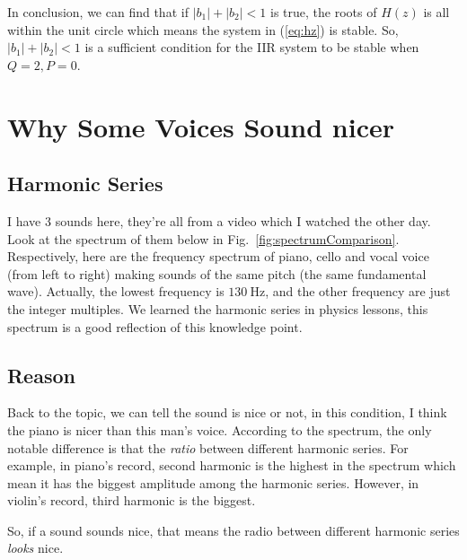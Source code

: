\documentclass{article}
\begin{document}
In conclusion, we can find that if $|b_1| + |b_2| < 1$ is true, the roots of $H(z)$ is all within the unit circle which means the system in (\ref{eq:hz}) is stable. So, $|b_1| + |b_2| < 1$ is a sufficient condition for the IIR system to be stable when $Q = 2, P = 0$.

\section{Why Some Voices Sound nicer}
\subsection{Harmonic Series}
I have 3 sounds here, they're all from a video\cite{harmonicSeries} which I watched the other day. Look at the spectrum of them below in Fig.~\ref{fig:spectrumComparison}. Respectively, here are the frequency spectrum of piano, cello and vocal voice (from left to right) making sounds of the same pitch (the same fundamental wave). Actually, the lowest frequency is $130~ \mathrm{Hz}$, and the other frequency are just the integer multiples. We learned the harmonic series in physics lessons, this spectrum is a good reflection of this knowledge point. 

\subsection{Reason}
Back to the topic, we can tell the sound is nice or not, in this condition, I think the piano is nicer than this man's voice. According to the spectrum, the only notable difference is that the \emph{ratio} between different harmonic series. For example, in piano's record, second harmonic is the highest in the spectrum which mean it has the biggest amplitude among the harmonic series. However, in violin's record, third harmonic is the biggest.

So, if a sound sounds nice, that means the radio between different harmonic series \emph{looks} nice.
\end{document}
